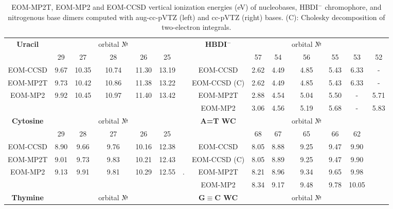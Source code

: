 \documentclass[12pt,nofootinbib]{revtex4}
\begin{document}
\begin{table}[!htbp]
  \centering
  \caption{EOM-MP2T, EOM-MP2 and EOM-CCSD vertical ionization energies (eV) of nucleobases, HBDI$^{-}$ chromophore, and nitrogenous base dimers computed with aug-cc-pVTZ (left) and cc-pVTZ (right) bases. (C): Cholesky decomposition of two-electron integrals.}
    \begin{tabular}{c|ccccc|c|c|cccccc}
    \hline\hline
    \textbf{Uracil}  &       &       & orbital № &       &       &       &   \textbf{HBDI$^{-}$}  &       &       & orbital № &       &       &   \\
     & 29    & 27    & 28    & 26    & 25    &       &  & 57    & 54    & 56    & 55    & 53    & 52 \\
        \hline
    EOM-CCSD & 9.67  & 10.35 & 10.74 & 11.30 & 13.19 &       & EOM-CCSD & 2.62  & 4.49  & 4.85  & 5.43  & 6.33  & - \\
    EOM-MP2T & 9.73  & 10.42 & 10.86 & 11.38 & 13.22 &       & EOM-CCSD (C) & 2.62  & 4.49  & 4.85  & 5.43  & 6.33  & - \\
    EOM-MP2 & 9.92  & 10.45 & 10.97 & 11.40 & 13.42 &       & EOM-MP2T & 2.88  & 4.54  & 5.04  & 5.50  & -     & 5.71 \\
          &       &       &       &       &       &       & EOM-MP2 & 3.06  & 4.56  & 5.19  & 5.68  & -     & 5.83 \\
    \hline
    \textbf{Cytosine}  &       &       & orbital № &       &       &     & \textbf{A=T WC}  &       &       & orbital № &       &       &     \\ 
    & 29    & 28    & 27    & 26    & 25    &  &  & 68    & 67    & 65    & 66    & 62    & \\
    \hline
    EOM-CCSD & 8.90  & 9.66  & 9.76  & 10.16 & 12.38 &  &  EOM-CCSD & 8.05  & 8.88  & 9.25  & 9.47  & 9.90  &     \\
    EOM-MP2T & 9.01  & 9.73  & 9.83  & 10.21 & 12.43 &       & EOM-CCSD (C) & 8.05  & 8.89  & 9.25  & 9.47  & 9.90  &   \\
    EOM-MP2 & 9.13  & 9.91  & 9.81  & 10.29 & 12.55 & .& EOM-MP2T & 8.21  & 8.96  & 9.34  & 9.65  & 9.98  &        \\
          &       &       &       &       &       &   & EOM-MP2 & 8.34  & 9.17  & 9.48  & 9.78  & 10.05 &      \\
    \hline
    \textbf{Thymine}         &       &       & orbital № &       &       &  & \textbf{G$\equiv$C WC}  &       &       & orbital № &       &       &     \\

\end{tabular}
\end{table}
\end{document}
